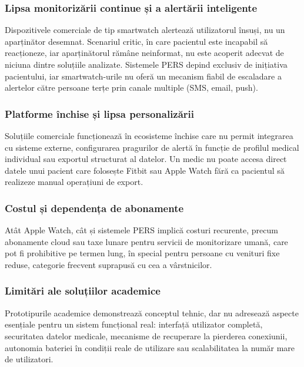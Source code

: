 \documentclass[12pt,a4paper,twoside]{article}
\begin{document}
\subsubsection{Lipsa monitorizării continue și a alertării inteligente}

Dispozitivele comerciale de tip smartwatch alertează utilizatorul însuși, nu un aparținător desemnat. Scenariul critic, în care pacientul este incapabil să reacționeze, iar aparținătorul rămâne neinformat, nu este acoperit adecvat de niciuna dintre soluțiile analizate. Sistemele PERS depind exclusiv de inițiativa pacientului, iar smartwatch-urile nu oferă un mecanism fiabil de escaladare a alertelor către persoane terțe prin canale multiple (SMS, email, push).

\subsubsection{Platforme închise și lipsa personalizării}

Soluțiile comerciale funcționează în ecosisteme închise care nu permit integrarea cu sisteme externe, configurarea pragurilor de alertă în funcție de profilul medical individual sau exportul structurat al datelor. Un medic nu poate accesa direct datele unui pacient care folosește Fitbit sau Apple Watch fără ca pacientul să realizeze manual operațiuni de export.

\subsubsection{Costul și dependența de abonamente}

Atât Apple Watch, cât și sistemele PERS implică costuri recurente, precum abonamente cloud sau taxe lunare pentru servicii de monitorizare umană, care pot fi prohibitive pe termen lung, în special pentru persoane cu venituri fixe reduse, categorie frecvent suprapusă cu cea a vârstnicilor.

\subsubsection{Limitări ale soluțiilor academice}

Prototipurile academice demonstrează conceptul tehnic, dar nu adresează aspecte esențiale pentru un sistem funcțional real: interfață utilizator completă, securitatea datelor medicale, mecanisme de recuperare la pierderea conexiunii, autonomia bateriei în condiții reale de utilizare sau scalabilitatea la număr mare de utilizatori.
\end{document}

